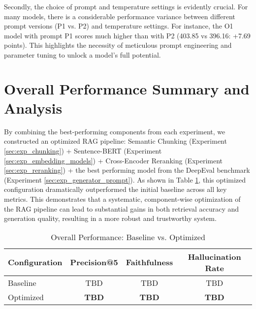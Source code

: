 Secondly, the choice of prompt and temperature settings is evidently crucial. For many models, there is a considerable performance variance between different prompt versions (P1 vs. P2) and temperature settings. For instance, the O1 model with prompt P1 scores much higher than with P2 (403.85 vs 396.16: +7.69 points). This highlights the necessity of meticulous prompt engineering and parameter tuning to unlock a model's full potential.


\section{Overall Performance Summary and Analysis}
\label{sec:overall_analysis}
By combining the best-performing components from each experiment, we constructed an optimized RAG pipeline: Semantic Chunking (Experiment \ref{sec:exp_chunking}) + Sentence-BERT (Experiment \ref{sec:exp_embedding_models}) + Cross-Encoder Reranking (Experiment \ref{sec:exp_reranking}) + the best performing model from the DeepEval benchmark (Experiment \ref{sec:exp_generator_prompt}). As shown in Table \ref{tab:overall_results}, this optimized configuration dramatically outperformed the initial baseline across all key metrics. This demonstrates that a systematic, component-wise optimization of the RAG pipeline can lead to substantial gains in both retrieval accuracy and generation quality, resulting in a more robust and trustworthy system.

\begin{table}[!htbp]
\centering
\caption{Overall Performance: Baseline vs. Optimized}
\label{tab:overall_results}
\begin{tabular}{|l|c|c|c|}
\hline
\textbf{Configuration} & \textbf{Precision@5} & \textbf{Faithfulness} & \textbf{Hallucination Rate} \\
\hline
Baseline & TBD & TBD & TBD \\
Optimized & \textbf{TBD} & \textbf{TBD} & \textbf{TBD} \\
\hline
\end{tabular}
\end{table}
